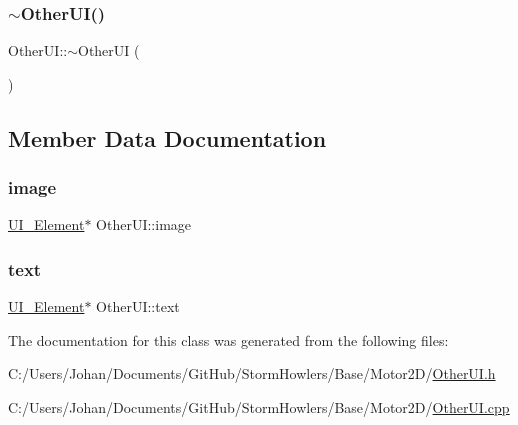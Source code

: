 \mbox{\label{class_other_u_i_a0669d35160c82ae4f4ea81751282c240}} 
\subsubsection{\texorpdfstring{$\sim$OtherUI()}{~OtherUI()}}
{\footnotesize\ttfamily Other\+U\+I\+::$\sim$\+Other\+UI (\begin{DoxyParamCaption}{ }\end{DoxyParamCaption})}



\subsection{Member Data Documentation}
\mbox{\label{class_other_u_i_a4e2319e8bc9ece97aa0a041c01b7e666}} 
\subsubsection{\texorpdfstring{image}{image}}
{\footnotesize\ttfamily \mbox{\hyperlink{class_u_i___element}{U\+I\+\_\+\+Element}}$\ast$ Other\+U\+I\+::image}

\mbox{\label{class_other_u_i_ac67a55f5ad3206125c93d7f76adce12c}} 
\subsubsection{\texorpdfstring{text}{text}}
{\footnotesize\ttfamily \mbox{\hyperlink{class_u_i___element}{U\+I\+\_\+\+Element}}$\ast$ Other\+U\+I\+::text}



The documentation for this class was generated from the following files\+:\begin{DoxyCompactItemize}
\item 
C\+:/\+Users/\+Johan/\+Documents/\+Git\+Hub/\+Storm\+Howlers/\+Base/\+Motor2\+D/\mbox{\hyperlink{_other_u_i_8h}{Other\+U\+I.\+h}}\item 
C\+:/\+Users/\+Johan/\+Documents/\+Git\+Hub/\+Storm\+Howlers/\+Base/\+Motor2\+D/\mbox{\hyperlink{_other_u_i_8cpp}{Other\+U\+I.\+cpp}}\end{DoxyCompactItemize}
